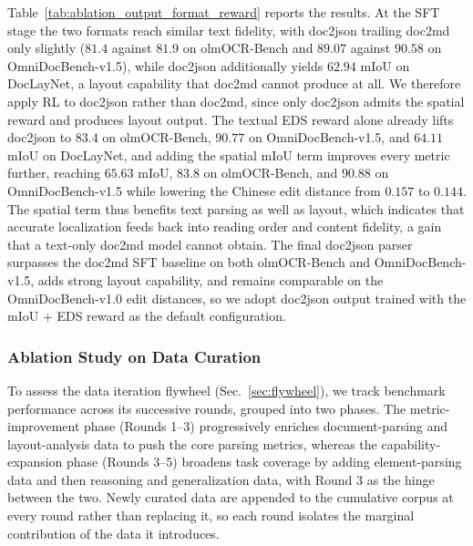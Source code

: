 Table~\ref{tab:ablation_output_format_reward} reports the results. At the SFT stage the two formats reach similar text fidelity, with doc2json trailing doc2md only slightly ($81.4$ against $81.9$ on olmOCR-Bench and $89.07$ against $90.58$ on OmniDocBench-v1.5), while doc2json additionally yields $62.94$ mIoU on DocLayNet, a layout capability that doc2md cannot produce at all. We therefore apply RL to doc2json rather than doc2md, since only doc2json admits the spatial reward and produces layout output. The textual EDS reward alone already lifts doc2json to $83.4$ on olmOCR-Bench, $90.77$ on OmniDocBench-v1.5, and $64.11$ mIoU on DocLayNet, and adding the spatial mIoU term improves every metric further, reaching $65.63$ mIoU, $83.8$ on olmOCR-Bench, and $90.88$ on OmniDocBench-v1.5 while lowering the Chinese edit distance from $0.157$ to $0.144$. The spatial term thus benefits text parsing as well as layout, which indicates that accurate localization feeds back into reading order and content fidelity, a gain that a text-only doc2md model cannot obtain. The final doc2json parser surpasses the doc2md SFT baseline on both olmOCR-Bench and OmniDocBench-v1.5, adds strong layout capability, and remains comparable on the OmniDocBench-v1.0 edit distances, so we adopt doc2json output trained with the mIoU + EDS reward as the default configuration.

\subsubsection{Ablation Study on Data Curation}
\label{sec:ablation_data_curation}

To assess the data iteration flywheel (Sec.~\ref{sec:flywheel}), we track benchmark performance across its successive rounds, grouped into two phases. The metric-improvement phase (Rounds 1--3) progressively enriches document-parsing and layout-analysis data to push the core parsing metrics, whereas the capability-expansion phase (Rounds 3--5) broadens task coverage by adding element-parsing data and then reasoning and generalization data, with Round 3 as the hinge between the two. Newly curated data are appended to the cumulative corpus at every round rather than replacing it, so each round isolates the marginal contribution of the data it introduces.

\begin{table}[htbp]
\centering
\caption{Ablation on the metric-improvement rounds (Rounds 1--3), which progressively add document-parsing and layout-analysis data.}
\label{tab:ablation_data_curation_structure}
\end{table}

